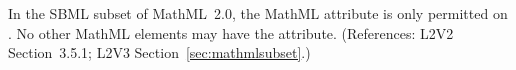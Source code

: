 In the SBML subset of MathML~2.0, the MathML attribute
 is only permitted on .  No other
MathML elements may have the  attribute.
(References: L2V2 Section~3.5.1; L2V3 Section~\ref{sec:mathmlsubset}.)
